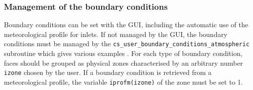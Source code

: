 {\subsubsection{Management of the boundary conditions}

Boundary conditions can be set with the GUI, including the automatic use of the meteorological
profile for inlets.
If not managed by the GUI, the boundary conditions must be managed by the \texttt{cs\_user\_boundary\_conditions\_atmospheric} subroutine
which gives various examples . For each type of boundary condition, faces should be grouped as physical zones characterised
by an arbitrary number \texttt{izone} chosen by the user. If a boundary condition is retrieved from a meteorological profile,
 the variable \texttt{iprofm(izone)} of the zone must be set to 1.







}
